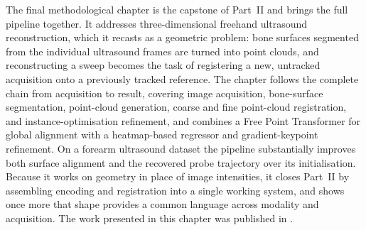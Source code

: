 

The final methodological chapter is the capstone of Part~II and brings the full pipeline
together. It addresses three-dimensional freehand ultrasound reconstruction, which it
recasts as a geometric problem: bone surfaces segmented from the individual ultrasound
frames are turned into point clouds, and reconstructing a sweep becomes the task of
registering a new, untracked acquisition onto a previously tracked reference. The chapter
follows the complete chain from acquisition to result, covering image acquisition,
bone-surface segmentation, point-cloud generation, coarse and fine point-cloud registration,
and instance-optimisation refinement, and combines a Free Point Transformer for global
alignment with a heatmap-based regressor and gradient-keypoint refinement. On a forearm
ultrasound dataset the pipeline substantially improves both surface alignment and the
recovered probe trajectory over its initialisation. Because it works on geometry in place of
image intensities, it closes Part~II by assembling encoding and registration into a single
working system, and shows once more that shape provides a common language across modality
and acquisition. The work presented in this chapter was published in
\citep{grossbrohmer20253d}.




